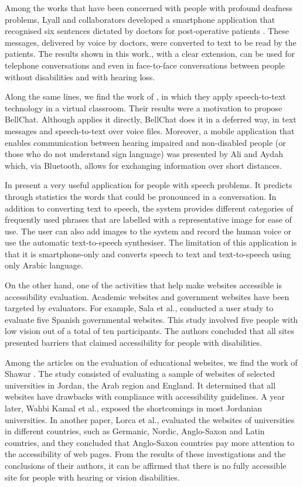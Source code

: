 \documentclass{svproc}
\begin{document}
Among the works that have been concerned with people with profound deafness problems, Lyall and collaborators developed a smartphone application that recognised six sentences dictated by doctors for post-operative patients \cite{Lyall2016}. These messages, delivered by voice by doctors, were converted to text to be read by the patients. The results shown in this work., with a clear extension, can be used for telephone conversations and even in face-to-face conversations between people without disabilities and with hearing loss.

Along the same lines, we find the work of \cite{Shadiev2014}, in which they apply speech-to-text technology in a virtual classroom. Their results were a motivation to propose BellChat. Although \cite{Shadiev2014} applies it directly, BellChat does it in a deferred way, in text messages and speech-to-text over voice files. Moreover, a mobile application that enables communication between hearing impaired and non-disabled people (or those who do not understand sign language) was presented by Ali and Aydah \cite{Ali2012} which, via Bluetooth, allows for exchanging information over short distances.

In \cite{Alsaif2017} present a very useful application for people with speech problems. It predicts through statistics the words that could be pronounced in a conversation. In addition to converting text to speech, the system provides different categories of frequently used phrases that are labelled with a representative image for ease of use. The user can also add images to the system and record the human voice or use the automatic text-to-speech synthesiser. The limitation of this application is that it is smartphone-only and converts speech to text and text-to-speech using only Arabic language.

On the other hand, one of the activities that help make websites accessible is accessibility evaluation. Academic websites and government websites have been targeted by evaluators. For example, Sala et al., \cite{Sala2020} conducted a user study to evaluate five Spanish governmental websites. This study involved five people with low vision out of a total of ten participants. The authors concluded that all sites presented barriers that claimed accessibility for people with disabilities.

Among the articles on the evaluation of educational websites, we find the work of Shawar \cite{Shawar2015}. The study consisted of evaluating a sample of websites of selected universities in Jordan, the Arab region and England. It determined that all websites have drawbacks with compliance with accessibility guidelines. A year later, Wahbi Kamal et al., \cite{Wahbi2016} exposed the shortcomings in most Jordanian universities. In another paper, Lorca et al., \cite{Lorca2018} evaluated the websites of universities in different countries, such as Germanic, Nordic, Anglo-Saxon and Latin countries, and they concluded that Anglo-Saxon countries pay more attention to the accessibility of web pages. From the results of these investigations and the conclusions of their authors, it can be affirmed that there is no fully accessible site for people with hearing or vision disabilities.
\end{document}
